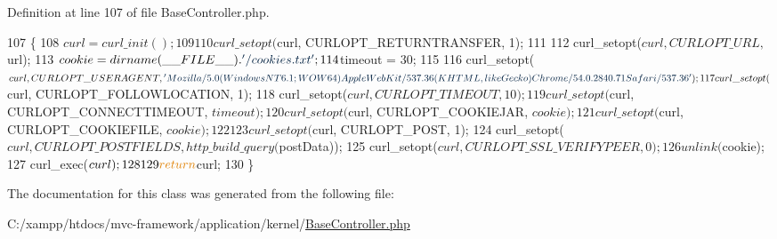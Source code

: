 Definition at line 107 of file Base\+Controller.\+php.


\begin{DoxyCode}
107                                                 \{
108         $curl = curl\_init();
109 
110         curl\_setopt($curl, CURLOPT\_RETURNTRANSFER, 1); 
111 
112         curl\_setopt($curl, CURLOPT\_URL, $url);
113         $cookie = dirname(\_\_FILE\_\_) . \textcolor{stringliteral}{'/cookies.txt'};
114         $timeout = 30;
115 
116         curl\_setopt($curl, CURLOPT\_USERAGENT, \textcolor{stringliteral}{'Mozilla/5.0 (Windows NT 6.1; WOW64) AppleWebKit/537.36
       (KHTML, like Gecko) Chrome/54.0.2840.71 Safari/537.36'});
117         curl\_setopt($curl, CURLOPT\_FOLLOWLOCATION, 1);
118         curl\_setopt($curl, CURLOPT\_TIMEOUT, 10); 
119         curl\_setopt($curl, CURLOPT\_CONNECTTIMEOUT, $timeout);
120         curl\_setopt($curl, CURLOPT\_COOKIEJAR, $cookie);
121         curl\_setopt($curl, CURLOPT\_COOKIEFILE, $cookie);
122 
123         curl\_setopt($curl, CURLOPT\_POST, 1); 
124         curl\_setopt($curl, CURLOPT\_POSTFIELDS, http\_build\_query($postData));     
125         curl\_setopt($curl, CURLOPT\_SSL\_VERIFYPEER, 0);
126         unlink($cookie);
127         curl\_exec($curl);
128 
129         \textcolor{keywordflow}{return} $curl;
130     \}
\end{DoxyCode}


The documentation for this class was generated from the following file\+:\begin{DoxyCompactItemize}
\item 
C\+:/xampp/htdocs/mvc-\/framework/application/kernel/\hyperlink{_base_controller_8php}{Base\+Controller.\+php}\end{DoxyCompactItemize}
